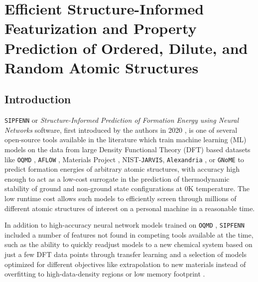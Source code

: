 
\chapter{Efficient Structure-Informed Featurization and Property Prediction of Ordered, Dilute, and Random Atomic Structures} \label{chap:pysipfenn}


\section{Introduction} \label{pysipfenn:sec:Introduction}

\texttt{SIPFENN} or \textit{Structure-Informed Prediction of Formation Energy using Neural Networks} software, first introduced by the authors in 2020 \cite{Krajewski2022ExtensibleNetworks, Krajewski2020SIPFENNModels}, is one of several open-source tools available in the literature \cite{Ward2017, Jha2019IRNet, Chen2019GraphCrystals, Choudhary2021AtomisticPredictions, Deng2023CHGNetModelling, Davariashtiyani2023FormationRepresentation, Davariashtiyani2023FormationRepresentation, Schmidt2023Machine-Learning-AssistedMaterials} which train machine learning (ML) models on the data from large Density Functional Theory (DFT) based datasets like \texttt{OQMD} \cite{Saal2013MaterialsOQMD, Kirklin2015TheEnergies, Shen2022ReflectionsOQMD}, \texttt{AFLOW} \cite{Curtarolo2013AFLOW:Discovery, Toher2018TheDiscovery}, Materials Project \cite{Jain2013Commentary:Innovation}, NIST-\texttt{JARVIS}\cite{Choudhary2020TheDesign}, \texttt{Alexandria} \cite{Schmidt2022AFunctionals}, or \texttt{GNoME} \cite{Merchant2023ScalingDiscovery} to predict formation energies of arbitrary atomic structures, with accuracy high enough to act as a low-cost surrogate in the prediction of thermodynamic stability of ground and non-ground state configurations at 0K temperature. The low runtime cost allows such models to efficiently screen through millions of different atomic structures of interest on a personal machine in a reasonable time. 

In addition to high-accuracy neural network models trained on \texttt{OQMD} \cite{Saal2013MaterialsOQMD, Kirklin2015TheEnergies, Shen2022ReflectionsOQMD}, \texttt{SIPFENN} included a number of features not found in competing tools available at the time, such as the ability to quickly readjust models to a new chemical system based on just a few DFT data points through transfer learning and a selection of models optimized for different objectives like extrapolation to new materials instead of overfitting to high-data-density regions or low memory footprint \cite{Krajewski2022ExtensibleNetworks}.


